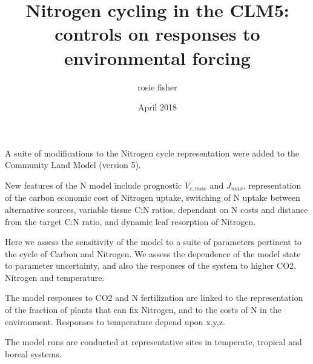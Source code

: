 \documentclass[draft,linenumbers]{agujournal}
\begin{document}

\title{Nitrogen cycling in the CLM5: controls on responses to environmental forcing}
\author{rosie fisher}
\date{April 2018}



\begin{keypoints}
\item A suite of modifications to the Nitrogen cycle representation were added to the Community Land Model (version 5).
\item New features of the N model include prognostic $V_{c,max}$ and $J_{max}$, representation of the carbon economic cost of Nitrogen uptake, switching of N uptake between alternative sources, variable tissue C:N ratios, dependant on N costs and distance from the target C:N ratio, and dynamic leaf resorption of Nitrogen. 
\item Here we assess the sensitivity of the model to a suite of parameters pertinent to the cycle of Carbon and Nitrogen. We assess the dependence of the model state to parameter uncertainty, and also the responses of the system to higher CO2, Nitrogen and temperature.
\item The model responses to CO2 and N fertilization are linked to the representation of the fraction of plants that can fix Nitrogen, and to the costs of N in the environment. Responses to temperature depend upon x,y,z.
\item The model runs are conducted at representative sites in temperate, tropical and boreal systems. 

\end{keypoints}
\end{document}
